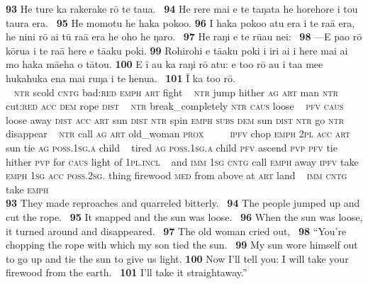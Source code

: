 \bigskip\gll
\textbf{\textup{93}} He ture ka rakerake rō te tau{\ꞌ}a. ~\textbf{\textup{94}} He rere mai e te taŋata he horehore i tou taura era. ~\textbf{\textup{95}} He momotu he haka poko{\ꞌ}o. \textbf{\textup{96}} I haka poko{\ꞌ}o atu era i te ra{\ꞌ}ā era, he nini rō {\ꞌ}ai tū ra{\ꞌ}ā era he oho he ŋaro. ~\textbf{\textup{97}} He raŋi e te rū{\ꞌ}au nei: ~\textbf{\textup{98}} —E pa{\ꞌ}o rō kōrua i te ra{\ꞌ}ā here e tā{\ꞌ}aku poki. \textbf{\textup{99}} Rohirohi e tā{\ꞌ}aku poki i iri ai i here mai ai mo haka mā{\ꞌ}eha o tātou. \textbf{\textup{100}} {\ꞌ}E {\ꞌ}ī au ka raŋi rō atu: e to{\ꞌ}o rō au i ta{\ꞌ}a me{\ꞌ}e hukahuka ena mai ruŋa i te henua. ~\textbf{\textup{101}} {\ꞌ}\=I ka to{\ꞌ}o rō.\\
~ \textsc{ntr} scold \textsc{cntg} bad:\textsc{red} \textsc{emph} \textsc{art} fight ~ \textsc{ntr} jump hither \textsc{ag} \textsc{art} man \textsc{ntr} cut:\textsc{red} \textsc{acc} \textsc{dem} rope \textsc{dist} ~ \textsc{ntr} break\_completely \textsc{ntr} \textsc{caus} loose  ~ \textsc{pfv} \textsc{caus} loose away \textsc{dist} \textsc{acc} \textsc{art} sun \textsc{dist} \textsc{ntr} spin \textsc{emph} \textsc{subs} \textsc{dem} sun \textsc{dist} \textsc{ntr} go \textsc{ntr} disappear ~ \textsc{ntr} call \textsc{ag} \textsc{art} old\_woman \textsc{prox} ~ ~~~\textsc{ipfv} chop \textsc{emph} \textsc{2pl} \textsc{acc} \textsc{art} sun tie \textsc{ag} \textsc{poss.1sg.a} child ~ tired \textsc{ag} \textsc{poss.1sg.a} child \textsc{pfv} ascend \textsc{pvp} \textsc{pfv} tie hither \textsc{pvp} for \textsc{caus} light of \textsc{1pl.incl} ~ and \textsc{imm} \textsc{1sg} \textsc{cntg} call \textsc{emph} away \textsc{ipfv} take \textsc{emph} \textsc{1sg} \textsc{acc} \textsc{poss.2sg.} thing firewood \textsc{med} from above at \textsc{art} land  ~ \textsc{imm} \textsc{cntg} take \textsc{emph}\\

\medskip\glt
\textbf{\textup{93}} They made reproaches and quarreled bitterly. ~\textbf{\textup{94}} The people jumped up and cut the rope. ~\textbf{\textup{95}} It snapped and the sun was loose. ~\textbf{\textup{96}} When the sun was loose, it turned around and disappeared. ~\textbf{\textup{97}} The old woman cried out, ~\textbf{\textup{98}} “You’re chopping the rope with which my son tied the sun. ~\textbf{\textup{99}} My sun wore himself out to go up and tie the sun to give us light. \textbf{\textup{100}} Now I’ll tell you: I will take your firewood from the earth. ~\textbf{\textup{101}} I’ll take it straightaway.”


